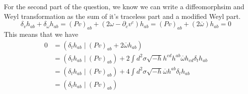 \documentclass[11pt, oneside]{article}   	%
\theoremstyle{slanted}
\begin{document}
For the second part of the 
question, we know we can write
a diffeomorphsim and Weyl transformation as
the sum of it's traceless part and a modified Weyl part. 
\[
 \delta _ v h _{ ab } + \delta _{\omega } h _{  ab }  
 = \left( P v  \right)  _{ ab } + \left(  2 \omega - \partial  _ c 
 v ^ c  \right)  h _{ ab }  = 
 \left( P v  \right)  _{ ab } +  \left( 2 \overline{ \omega }  \right) h _{ ab }  =0  
\] 
This means that we 
have 
\begin{align*}
	0 &=  \left( \delta _ t h _{ ab } \mid \left( P v  \right)  _{ ab } 
	+ 2 \overline{ \omega } h _{ ab } \right)    \\ 
	  &=  \left( \delta _ t h _{ ab } \mid (P v ) _{ ab }  \right)  
	  + 2 \int d ^ 2 \sigma \sqrt{ -h }  h ^{ cd } h ^{ ab } \overline{ \omega } 
	  h _{ cd } \delta _ t h _{ ab } \\ 
	  &=  \left( \delta _ t h_{ ab } \mid \left( P v  \right)  _{ ab }  \right)  
	  + 4 \int d ^ 2 \sigma \sqrt{ - h }  \overline{ \omega } h ^{ ab } \delta _ t h _{ ab }  \\ 
	  & = \left( \delta _t h _{ ab } \mid \left( P v  \right) _{ ab }  \right)  
\end{align*}

\pagebreak 
\end{document}

